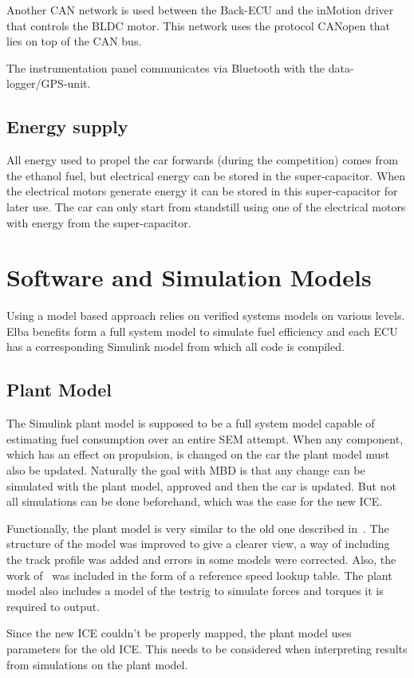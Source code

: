 Another CAN network is used between the Back-ECU and the inMotion driver that
controls the BLDC motor. This network uses the protocol CANopen that
lies on top of the CAN bus.

The instrumentation panel communicates via Bluetooth with the data-logger/GPS-unit.

\subsection{Energy supply}
All energy used to propel the car forwards (during the competition) comes from
the ethanol fuel, but electrical energy can be stored in the super-capacitor.
When the electrical motors generate energy it can be stored in this
super-capacitor for later use. The car can only start from standstill using one
of the electrical motors with energy from the super-capacitor.  

\section{Software and Simulation Models}
Using a model based approach relies on verified systems models on various
levels. Elba benefits form a full system model to simulate fuel efficiency and
each ECU has a corresponding Simulink model from which all code is compiled.

\subsection{Plant Model}
The Simulink plant model is supposed to be a full system model capable of
estimating fuel consumption over an entire SEM attempt. When any component,
which has an effect on propulsion, is changed on the car the plant model must
also be updated. Naturally the goal with MBD is that any change can be simulated
with the plant model, approved and then the car is updated. But not all
simulations can be done beforehand, which was the case for the new ICE\@. 

Functionally, the plant model is very similar to the old one described
in~\cite{elba2015}. The structure of the model was improved to give a clearer
view, a way of including the track profile was added and errors in some models
were corrected. Also, the work of~\citep{liu2016} was included in the form of a
reference speed lookup table. The plant model also includes a model of the
testrig to simulate forces and torques it is required to output.

Since the new ICE couldn't be properly mapped, the plant model uses parameters
for the old ICE\@. This needs to be considered when interpreting results from
simulations on the plant model.

